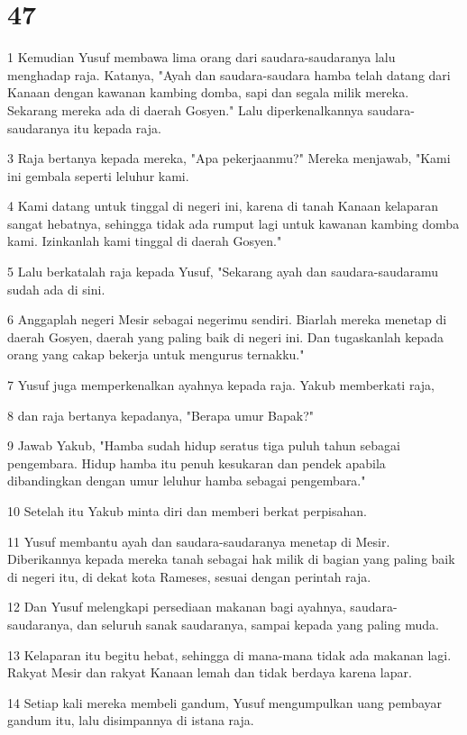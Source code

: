 \chapter{47}

\par 1 Kemudian Yusuf membawa lima orang dari saudara-saudaranya lalu menghadap raja. Katanya, "Ayah dan saudara-saudara hamba telah datang dari Kanaan dengan kawanan kambing domba, sapi dan segala milik mereka. Sekarang mereka ada di daerah Gosyen." Lalu diperkenalkannya saudara-saudaranya itu kepada raja.
\par 3 Raja bertanya kepada mereka, "Apa pekerjaanmu?" Mereka menjawab, "Kami ini gembala seperti leluhur kami.
\par 4 Kami datang untuk tinggal di negeri ini, karena di tanah Kanaan kelaparan sangat hebatnya, sehingga tidak ada rumput lagi untuk kawanan kambing domba kami. Izinkanlah kami tinggal di daerah Gosyen."
\par 5 Lalu berkatalah raja kepada Yusuf, "Sekarang ayah dan saudara-saudaramu sudah ada di sini.
\par 6 Anggaplah negeri Mesir sebagai negerimu sendiri. Biarlah mereka menetap di daerah Gosyen, daerah yang paling baik di negeri ini. Dan tugaskanlah kepada orang yang cakap bekerja untuk mengurus ternakku."
\par 7 Yusuf juga memperkenalkan ayahnya kepada raja. Yakub memberkati raja,
\par 8 dan raja bertanya kepadanya, "Berapa umur Bapak?"
\par 9 Jawab Yakub, "Hamba sudah hidup seratus tiga puluh tahun sebagai pengembara. Hidup hamba itu penuh kesukaran dan pendek apabila dibandingkan dengan umur leluhur hamba sebagai pengembara."
\par 10 Setelah itu Yakub minta diri dan memberi berkat perpisahan.
\par 11 Yusuf membantu ayah dan saudara-saudaranya menetap di Mesir. Diberikannya kepada mereka tanah sebagai hak milik di bagian yang paling baik di negeri itu, di dekat kota Rameses, sesuai dengan perintah raja.
\par 12 Dan Yusuf melengkapi persediaan makanan bagi ayahnya, saudara-saudaranya, dan seluruh sanak saudaranya, sampai kepada yang paling muda.
\par 13 Kelaparan itu begitu hebat, sehingga di mana-mana tidak ada makanan lagi. Rakyat Mesir dan rakyat Kanaan lemah dan tidak berdaya karena lapar.
\par 14 Setiap kali mereka membeli gandum, Yusuf mengumpulkan uang pembayar gandum itu, lalu disimpannya di istana raja.
